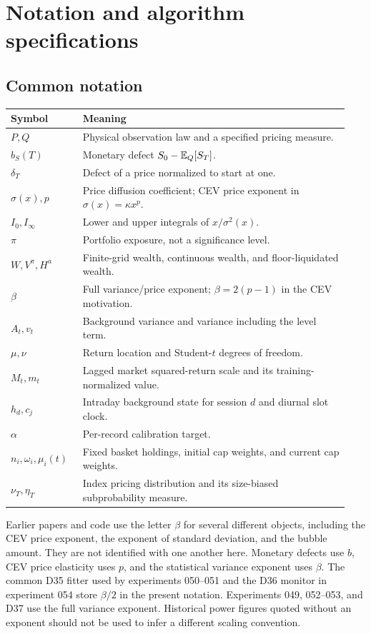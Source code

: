 \clearpage
\appendix
\section{Notation and algorithm specifications}\label{app:algorithms}
\subsection{Common notation}
\begin{longtable}{@{}L{0.20\linewidth}L{0.74\linewidth}@{}}
\toprule Symbol & Meaning\\\midrule\endhead
$P,Q$ & Physical observation law and a specified pricing measure.\\
$b_S(T)$ & Monetary defect $S_0-\mathbb{E}_Q[S_T]$.\\
$\delta_T$ & Defect of a price normalized to start at one.\\
$\sigma(x),p$ & Price diffusion coefficient; CEV price exponent in $\sigma(x)=\kappa x^p$.\\
$I_0,I_\infty$ & Lower and upper integrals of $x/\sigma^2(x)$.\\
$\pi$ & Portfolio exposure, not a significance level.\\
$W,V^\pi,H^a$ & Finite-grid wealth, continuous wealth, and floor-liquidated wealth.\\
$\beta$ & Full variance/price exponent; $\beta=2(p-1)$ in the CEV motivation.\\
$A_t,v_t$ & Background variance and variance including the level term.\\
$\mu,\nu$ & Return location and Student-$t$ degrees of freedom.\\
$M_t,m_t$ & Lagged market squared-return scale and its training-normalized value.\\
$h_d,c_j$ & Intraday background state for session $d$ and diurnal slot clock.\\
$\alpha$ & Per-record calibration target.\\
$n_i,\omega_i,\mu_i(t)$ & Fixed basket holdings, initial cap weights, and current cap weights.\\
$\nu_T,\eta_T$ & Index pricing distribution and its size-biased subprobability measure.\\
\bottomrule
\end{longtable}
Earlier papers and code use the letter $\beta$ for several different
objects, including the CEV price exponent, the exponent of standard
deviation, and the bubble amount. They are not identified with one another
here. Monetary defects use $b$, CEV price elasticity uses $p$, and the
statistical variance exponent uses $\beta$. The common D35 fitter used by experiments 050--051 and the D36 monitor
in experiment 054 store $\beta/2$ in the present notation. Experiments
049, 052--053, and D37 use the full variance exponent. Historical power figures quoted without an
exponent should not be used to infer a different scaling convention.

